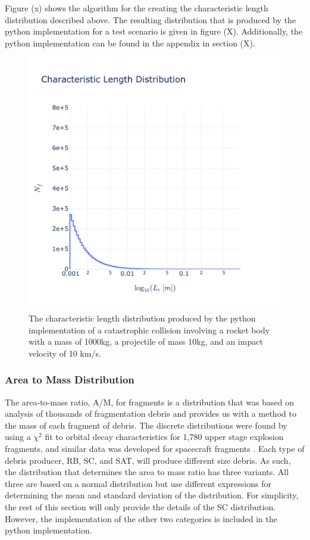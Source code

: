 \documentclass{article}
\begin{document}
Figure (x) shows the algorithm for the creating the characteristic length distribution described above.  The resulting distribution that is produced by the python implementation for a test scenario is given in figure (X). Additionally, the python implementation can be found in the appendix in section (X).
\begin{figure}[H]
	\centering
	\includegraphics[scale=0.3, trim=0cm 0cm 0cm 10cm]{N_f_vs_L_c}
	\caption{The characteristic length distribution produced by the python implementation of a catastrophic collision involving a rocket body with a mass of 1000kg, a projectile of mass 10kg, and an impact velocity of 10 km/s.}
\end{figure}

\subsubsection{Area to Mass Distribution }

The area-to-mass ratio, A/M, for fragments is a distribution that was based on analysis of thousands of fragmentation debris and provides us with a method to the mass of each fragment of debris. The discrete distributions were found by using a $\chi^2$ fit to orbital decay characteristics for 1,780 upper stage explosion fragments, and similar data was developed for spacecraft fragments \citep{johnson_nasas_2001}. Each type of debris producer, RB, SC, and SAT, will produce different size debris. As such, the distribution that determines the area to mass ratio has three variants. All three are based on a normal distribution but use different expressions for determining the mean and standard deviation of the distribution. For simplicity, the rest of this section will only provide the details of the SC distribution. However, the implementation of the other two categories is included in the python implementation.
\end{document}
